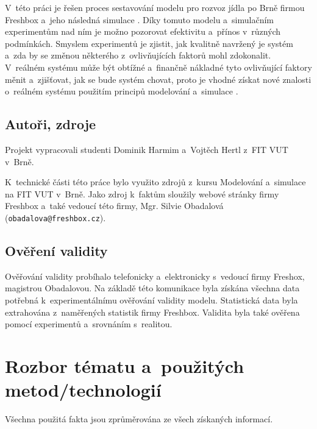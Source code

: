 \documentclass[a4paper, 11pt]{article}
\begin{document}
	V~této práci je řešen proces sestavování modelu \cite[snímek 7]{IMS_slides}
	pro rozvoz jídla po Brně firmou Freshbox \cite{Freshbox} a~jeho následná
	simulace \cite[snímek 33]{IMS_slides}. Díky tomuto modelu a~simulačním
	experimentům \cite[snímek 9]{IMS_slides} nad ním je možno pozorovat
	efektivitu a~přínos v~různých podmínkách. Smyslem experimentů je zjistit,
	jak kvalitně navržený je systém \cite[snímek 18]{IMS_slides} a~zda by se
	změnou některého z~ovlivňujících faktorů mohl zdokonalit. V~reálném
	systému může být obtížné a~finančně nákladné tyto ovlivňující faktory
	měnit a~zjišťovat, jak se bude systém chovat, proto je vhodné získat
	nové znalosti o~reálném systému použitím principů modelování
	a~simulace \cite[snímek 9]{IMS_slides}.


	\subsection{Autoři, zdroje}

	Projekt vypracovali studenti Dominik Harmim a~Vojtěch Hertl z~FIT VUT
	v~Brně.

	K~technické části této práce bylo využito zdrojů z~kursu Modelování
	a~simulace na FIT VUT v~Brně. Jako zdroj k~faktům sloužily webové stránky
	firmy Freshbox a~také vedoucí této firmy, Mgr. Silvie Obadalová\\
	(\texttt{obadalova@freshbox.cz}).


	\subsection{Ověření validity}

	Ověřování validity \cite[snímek 37]{Freshbox} probíhalo telefonicky
	a~elektronicky s~vedoucí firmy Freshox, magistrou Obadalovou. Na základě
	této komunikace byla získána všechna data potřebná k~experimentálnímu
	ověřování validity modelu. Statistická data byla extrahována z~naměřených
	statistik firmy Freshbox. Validita byla také ověřena pomocí experimentů
	a~srovnáním s~realitou.



	\section{Rozbor tématu a~použitých metod/technologií}

	Všechna použitá fakta jsou zprůměrována ze všech získaných informací. \\
\end{document}
